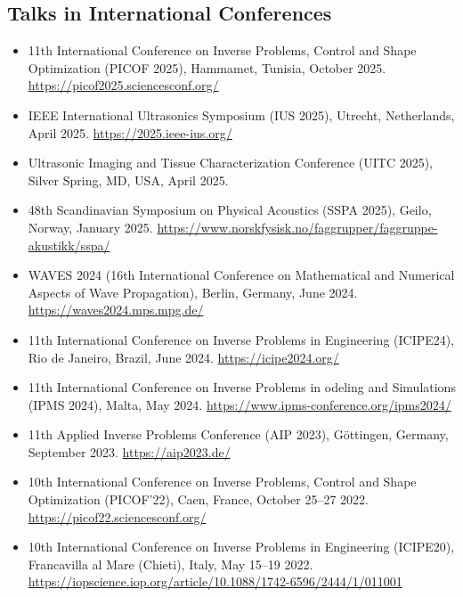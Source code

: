 \documentclass[10pt]{article} %
\begin{document}
\subsection{Talks in International Conferences}
\begin{itemize}
\item 11th International Conference on Inverse Problems, Control and Shape Optimization (PICOF 2025), Hammamet, Tunisia, October 2025. \url{https://picof2025.sciencesconf.org/}
\item IEEE International Ultrasonics Symposium (IUS 2025), Utrecht, Netherlands, April 2025. \url{https://2025.ieee-ius.org/}
\item Ultrasonic Imaging and Tissue Characterization Conference (UITC 2025), Silver Spring, MD, USA, April 2025.
\item 48th Scandinavian Symposium on Physical Acoustics (SSPA 2025), Geilo, Norway, January 2025. \url{https://www.norskfysisk.no/faggrupper/faggruppe-akustikk/sspa/}
\item WAVES 2024 (16th International Conference on Mathematical and Numerical Aspects of Wave Propagation), Berlin, Germany, June 2024. \url{https://waves2024.mps.mpg.de/}
\item 11th International Conference on Inverse Problems in Engineering (ICIPE24), Rio de Janeiro, Brazil, June 2024. \url{https://icipe2024.org/}
\item 11th International Conference on Inverse Problems in odeling and Simulations (IPMS 2024), Malta, May 2024. \url{https://www.ipms-conference.org/ipms2024/}
\item 11th Applied Inverse Problems Conference (AIP 2023), Göttingen, Germany, September 2023. \url{https://aip2023.de/}
\item 10th International Conference on Inverse Problems, Control and Shape Optimization (PICOF'22), Caen, France, October 25--27 2022. \url{https://picof22.sciencesconf.org/}
\item 10th International Conference on Inverse Problems in Engineering (ICIPE20), Francavilla al Mare (Chieti), Italy, May 15--19 2022. \url{https://iopscience.iop.org/article/10.1088/1742-6596/2444/1/011001}
\end{itemize}
\end{document}
